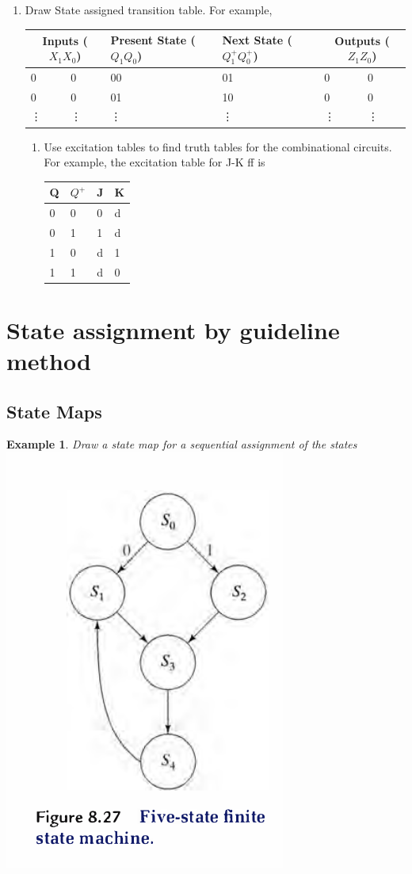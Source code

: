 \documentclass{article}
\newtheorem{example}{Example}
\begin{document}
\begin{enumerate}
   \item Draw State assigned transition table. For example,\\
     \begin{tabular}{llllll}
       \toprule
       \multicolumn{2}{c}{Inputs ($X_1 X_0$) } & Present State ($Q_1 Q_0$) & Next State ($Q_1^+Q_0^+$)& \multicolumn{2}{c}{Outputs ($Z_1 Z_0$)} \\
       \midrule
       0 & 0 & 00 & 01 & 0 & 0\\
       0 & 0 & 01 & 10 & 0 & 0\\
       \vdots & \vdots & \vdots & \vdots & \vdots & \vdots \\
       \bottomrule
     \end{tabular}
     \begin{enumerate}
       \item Use excitation tables to find truth tables for the combinational
         circuits. For example, the excitation table for J-K ff is\\
         \begin{tabular}{ll|ll}
           \toprule
           Q & $Q^{+}$ & J & K\\
           \midrule
           0 & 0 & 0 & d \\
           0 & 1 & 1 & d \\
           1 & 0 & d & 1 \\
           1 & 1 & d & 0 \\
           \bottomrule
         \end{tabular}
     \end{enumerate}
\end{enumerate}

\section{State assignment by guideline method ~\cite[Section~8.2.5]{katz2004contemporary}}
\subsection{State Maps}

\begin{example}
 Draw a state map for a sequential assignment  of the states\\
  \includegraphics[width=0.2\linewidth]{./media/fig8.27-five-state-FSM.png}
\end{example}
\end{document}
